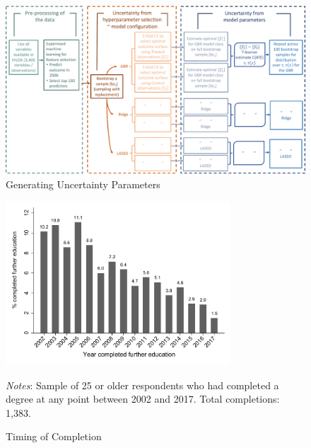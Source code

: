 \documentclass[12pt, a4paper]{article}
\begin{document}
\begin{figure}[H]
\centering
\caption{Generating Uncertainty Parameters}
  \label{fig:exp_param}
    \includegraphics[scale=0.5]{_figures/explainer2.pdf}
\end{figure}




\begin{figure}[H]
\centering
\caption{Timing of Completion}
\vspace{0.5cm}
  \label{fig:yearcomp}
    \includegraphics[width=0.75\textwidth]{_figures/year_completed.pdf}
    \parbox{1\textwidth}{\footnotesize{\textit{Notes}: Sample of 25 or older respondents who had completed a degree at any point between 2002 and 2017. Total completions: 1,383.}}
\end{figure}
\end{document}
